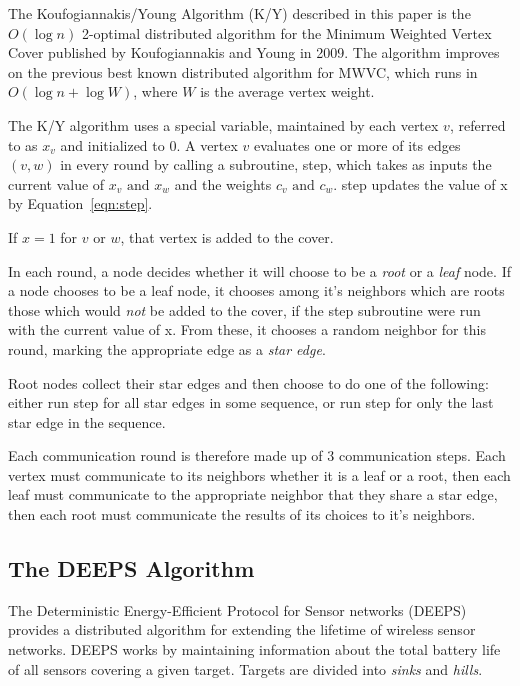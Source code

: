 \documentclass[conference, 10pt]{IEEEtran}
\begin{document}
The Koufogiannakis/Young Algorithm (K/Y) described in this paper is the $O(\log n)$ 2-optimal distributed algorithm for the Minimum Weighted Vertex Cover published by Koufogiannakis and Young in 2009\cite{1582746}. The algorithm improves on the previous best known distributed algorithm for MWVC, which runs in $O(\log n + \log W)$, where  $W$ is the average vertex weight\cite{1435381}.

The K/Y algorithm uses a special variable, maintained by each vertex $v$, referred to as $x_v$ and initialized to 0. A vertex $v$ evaluates one or more of its edges $(v, w)$ in every round by calling a subroutine, {\ttfamily step}, which takes as inputs the current value of $x_v \text{ and } x_w$ and the weights $c_v \text{ and } c_w$. {\ttfamily step} updates the value of x by Equation~\ref{eqn:step}.



If $x = 1 $ for $v \text{ or } w$, that vertex is added to the cover.

In each round, a node decides whether it will choose to be a {\em root} or a {\em leaf} node. If a node chooses to be a leaf node, it chooses among it's neighbors which are roots those which would {\em not} be added to the cover, if the {\ttfamily step} subroutine were run with the current value of x. From these, it chooses a random neighbor for this round, marking the appropriate edge as a {\em star edge}.

Root nodes collect their star edges and then choose to do one of the following: either run {\ttfamily step} for all star edges in some sequence, or run {\ttfamily step} for only the last star edge in the sequence. 

Each communication round is therefore made up of 3 communication steps. Each vertex must communicate to its neighbors whether it is a leaf or a root, then each leaf must communicate to the appropriate neighbor that they share a star edge, then each root must communicate the results of its choices to it's neighbors.


\subsection{The DEEPS Algorithm}
\label{sec:deeps}

The Deterministic Energy-Efficient Protocol for Sensor networks (DEEPS) provides a distributed algorithm for extending the lifetime of wireless sensor networks\cite{1640702}. DEEPS works by maintaining information about the total battery life of all sensors covering a given target. Targets are divided into {\em sinks} and {\em hills}. 
\end{document}
